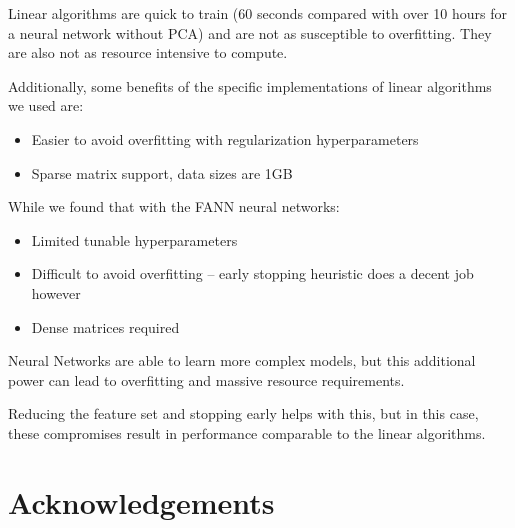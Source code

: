 \documentclass[journal]{IEEEtran}
\begin{document}
Linear algorithms are quick to train (60 seconds compared with over 10 hours
for a neural network without PCA) and are not as susceptible to overfitting.
They are also not as resource intensive to compute.

\par Additionally, some benefits of the specific implementations of linear algorithms we used are:
\begin{itemize}
    \item Easier to avoid overfitting with regularization hyperparameters
    \item Sparse matrix support, data sizes are 1GB
\end{itemize}

While we found that with the FANN neural networks:
\begin{itemize}
    \item Limited tunable hyperparameters
    \item Difficult to avoid overfitting -- early stopping heuristic does a decent job however
    \item Dense matrices required
\end{itemize}

\par Neural Networks are able to learn more complex models, but this additional
power can lead to overfitting and massive resource requirements.

\par Reducing the feature set and stopping early helps with this, but in this
case, these compromises result in performance comparable to the linear
algorithms.



\section{Acknowledgements}

\end{document}
